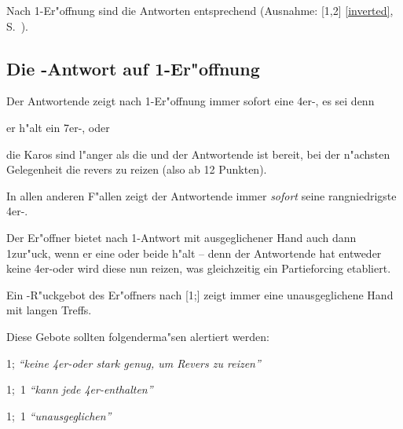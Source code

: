 
Nach 1\kar{}-Er"offnung sind die Antworten entsprechend
(Ausnahme: [1\kar{}\sep2\tre{}] \ra\ref{inverted}, S.~\pageref{inverted}).

%
%
\subsection{Die -Antwort auf 1\tre-Er"offnung}

Der Antwortende zeigt nach 1\tre-Er"offnung immer sofort eine
4er-\ofa, es sei denn
\begin{compactitem}
\item er h"alt ein 7\pl{}er-\ka, oder
\item die Karos sind l"anger als die \ofa und der Antwortende ist
  bereit, bei der n"achsten Gelegenheit die \ofa revers zu reizen
  (also ab 12 Punkten).
\end{compactitem}
In allen anderen F"allen zeigt der Antwortende immer \emph{sofort}
seine rangniedrigste 4er-\ofa.

Der Er"offner bietet nach 1\kar-Antwort mit ausgeglichener Hand auch
dann 1\SA zur"uck, wenn er eine oder beide \ofa h"alt -- denn der
Antwortende hat entweder keine 4er-\ofa oder wird diese nun reizen,
was gleichzeitig ein Partieforcing etabliert.

Ein \ofa-R"uckgebot des Er"offners nach [1\kar;] zeigt
immer eine unausgeglichene Hand mit langen Treffs.

Diese Gebote sollten folgenderma"sen alertiert werden:
\begin{compactdesc}
\item[1\tr-1\ka;] \emph{"`keine 4er-\ofa oder stark genug, um Revers zu
reizen"'}
\item[1\tr-1\ka;~1\SA] \emph{"`kann jede 4er-\ofa enthalten"'}
\item[1\tr-1\ka;~1\ofa] \emph{"`unausgeglichen"'}
\end{compactdesc}


